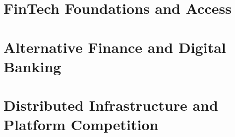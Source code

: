 \documentclass[11pt,oneside,a4paper]{report}
\begin{document}
\utpfrontmatter



\part{FinTech Foundations and Access}






\part{Alternative Finance and Digital Banking}









\part{Distributed Infrastructure and Platform Competition}










\end{document}
